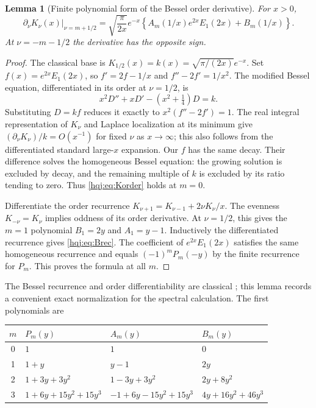 \documentclass[11pt,letterpaper]{article}
\numberwithin{equation}{section}
\newtheorem{lemma}[theorem]{Lemma}
\theoremstyle{definition}
\begin{document}
\begin{lemma}[Finite polynomial form of the Bessel order derivative]
\label{hqj:lem:Bessel}
For $x>0$,
\begin{equation}\label{hqj:eq:Korder}
\left.\partial_\nu K_\nu(x)\right|_{\nu=m+1/2}
=\sqrt{\frac\pi{2x}}e^{-x}
\left\{A_m(1/x)e^{2x}E_1(2x)+B_m(1/x)\right\}.
\end{equation}
At $\nu=-m-1/2$ the derivative has the opposite sign.
\end{lemma}
\begin{proof}
The classical base is $K_{1/2}(x)=k(x)=\sqrt{\pi/(2x)}e^{-x}$.
Set $f(x)=e^{2x}E_1(2x)$, so
$f'=2f-1/x$ and $f''-2f'=1/x^2$.
The modified Bessel equation, differentiated in its order at $\nu=1/2$,
is
\[
x^2D''+xD'-(x^2+\tfrac14)D=k.
\]
Substituting $D=kf$ reduces it exactly to
$x^2(f''-2f')=1$. The real integral representation of $K_\nu$ and
Laplace localization at its minimum give
$(\partial_\nu K_\nu)/k=O(x^{-1})$ for fixed $\nu$ as $x\to\infty$;
this also follows from the differentiated standard large-$x$ expansion.
Our $f$ has the same decay. Their difference solves the homogeneous
Bessel equation: the growing solution is excluded by decay, and the
remaining multiple of $k$ is excluded by its ratio tending to zero.
Thus \eqref{hqj:eq:Korder} holds at $m=0$.

Differentiate the order recurrence
$K_{\nu+1}=K_{\nu-1}+2\nu K_\nu/x$.
The evenness $K_{-\nu}=K_\nu$ implies oddness of its order derivative.
At $\nu=1/2$, this gives the $m=1$ polynomial $B_1=2y$ and
$A_1=y-1$. Inductively the differentiated recurrence gives
\eqref{hqj:eq:Brec}. The coefficient of $e^{2x}E_1(2x)$ satisfies the
same homogeneous recurrence and equals $(-1)^mP_m(-y)$ by the finite
recurrence for $P_m$. This proves the formula at all $m$.
\end{proof}
The Bessel recurrence and order differentiability are classical
\cite{besselrec,order}; this lemma records a convenient exact
normalization for the spectral calculation. The first polynomials are
\begin{center}
\begin{tabular}{c l l l}
\toprule
$m$ & $P_m(y)$ & $A_m(y)$ & $B_m(y)$\\
\midrule
0 & $1$ & $1$ & $0$\\
1 & $1+y$ & $y-1$ & $2y$\\
2 & $1+3y+3y^2$ & $1-3y+3y^2$ & $2y+8y^2$\\
3 & $1+6y+15y^2+15y^3$ & $-1+6y-15y^2+15y^3$
& $4y+16y^2+46y^3$\\
\bottomrule
\end{tabular}
\end{center}
\end{document}
